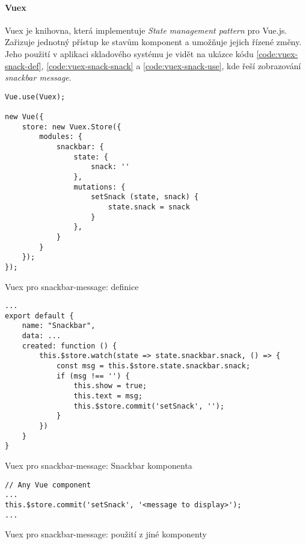 \paragraph{Vuex} Vuex \cite{vuex} je knihovna, která implementuje \emph{State management pattern} pro Vue.js. Zařizuje jednotný přístup ke stavům komponent a umožňuje jejich řízené změny. Jeho použití v aplikaci skladového systému je vidět na ukázce kódu \ref{code:vuex-snack-def}, \ref{code:vuex-snack-snack} a \ref{code:vuex-snack-use}, kde řeší zobrazování \emph{snackbar message}.

\begin{listing}[h]
\begin{verbatim}
Vue.use(Vuex);

new Vue({
    store: new Vuex.Store({
        modules: {
            snackbar: {
                state: {
                    snack: ''
                },
                mutations: {
                    setSnack (state, snack) {
                        state.snack = snack
                    }
                },
            }
        }
    });
});
\end{verbatim}
\caption{Vuex pro snackbar-message: definice} \label{code:vuex-snack-def}
\end{listing}

\begin{listing}[h]
\begin{verbatim}
...
export default {
    name: "Snackbar",
    data: ...
    created: function () {
        this.$store.watch(state => state.snackbar.snack, () => {
            const msg = this.$store.state.snackbar.snack;
            if (msg !== '') {
                this.show = true;
                this.text = msg;
                this.$store.commit('setSnack', '');
            }
        })
    }
}
\end{verbatim}
\caption{Vuex pro snackbar-message: Snackbar komponenta} \label{code:vuex-snack-snack}
\end{listing}

\begin{listing}[h]
\begin{verbatim}
// Any Vue component
...
this.$store.commit('setSnack', '<message to display>');
...
\end{verbatim}
\caption{Vuex pro snackbar-message: použití z jiné komponenty} \label{code:vuex-snack-use}
\end{listing}



